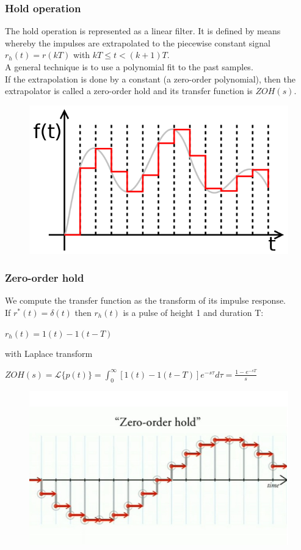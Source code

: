 \begin{frame}
	\frametitle{Hold operation}
	The hold operation is represented as a linear filter. It is defined by means whereby the impulses are extrapolated to the piecewise constant signal $r_h(t) = r(kT)$ with $kT \leq t < (k+1)T$.\\
	\medskip
	A general technique is to use a polynomial fit to the past samples.\\
	If the extrapolation is done by a constant (a zero-order polynomial), then the extrapolator is called a zero-order hold and its transfer function is $ZOH(s)$. 
	\begin{figure}
		\includegraphics[width=0.55\linewidth]{sample_and_hold}
	\end{figure}
\end{frame}

\begin{frame}
	\frametitle{Zero-order hold}
	We compute the transfer function as the transform of its impulse response. \\
	\medskip
	If $r^*(t)=\delta(t)$ then $r_h(t)$ is a pulse of height 1 and duration T:\\
	\begin{center}
		$r_h(t) = 1(t) - 1(t-T)$\\
	\end{center}
	with Laplace transform\\
	\begin{center}
		$ZOH(s)=\mathcal{L}\{p(t)\} = \int_{0}^{\infty} [1(t)-1(t-T)]e^{-s\tau}d\tau = \frac{1-e^{-sT}}{s}$
	\end{center}
	\begin{figure}
		\includegraphics[width=0.5\linewidth]{zoh}
	\end{figure}
\end{frame}


